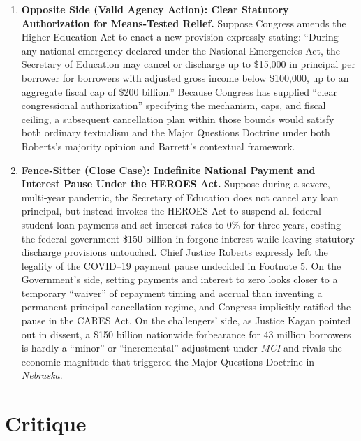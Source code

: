 \documentclass[12pt]{article}
\begin{document}
\begin{enumerate}
  \item \textbf{Opposite Side (Valid Agency Action): Clear Statutory Authorization for Means-Tested Relief.} Suppose Congress amends the Higher Education Act to enact a new provision expressly stating: ``During any national emergency declared under the National Emergencies Act, the Secretary of Education may cancel or discharge up to \$15,000 in principal per borrower for borrowers with adjusted gross income below \$100,000, up to an aggregate fiscal cap of \$200 billion.'' Because Congress has supplied ``clear congressional authorization'' specifying the mechanism, caps, and fiscal ceiling, a subsequent cancellation plan within those bounds would satisfy both ordinary textualism and the Major Questions Doctrine under both Roberts's majority opinion and Barrett's contextual framework.

  \item \textbf{Fence-Sitter (Close Case): Indefinite National Payment and Interest Pause Under the HEROES Act.} Suppose during a severe, multi-year pandemic, the Secretary of Education does not cancel any loan principal, but instead invokes the HEROES Act to suspend all federal student-loan payments and set interest rates to 0\% for three years, costing the federal government \$150 billion in forgone interest while leaving statutory discharge provisions untouched. Chief Justice Roberts expressly left the legality of the COVID--19 payment pause undecided in Footnote 5. On the Government's side, setting payments and interest to zero looks closer to a temporary ``waiver'' of repayment timing and accrual than inventing a permanent principal-cancellation regime, and Congress implicitly ratified the pause in the CARES Act. On the challengers' side, as Justice Kagan pointed out in dissent, a \$150 billion nationwide forbearance for 43 million borrowers is hardly a ``minor'' or ``incremental'' adjustment under \textit{MCI} and rivals the economic magnitude that triggered the Major Questions Doctrine in \textit{Nebraska}.
\end{enumerate}

\section{Critique}
\end{document}
